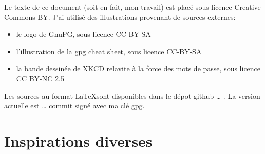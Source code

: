 \documentclass[10pt,a4paper,openany]{book}
\begin{document}
	Le texte de ce document (soit en fait, mon travail) est placé sous licence Creative Commons BY. J'ai utilisé des illustrations provenant de sources externes:
	\begin{itemize}
		\item le logo de GnuPG, sous licence CC-BY-SA
		\item l'illustration de la gpg cheat sheet, sous licence CC-BY-SA
		\item la bande dessinée de XKCD relavite à la force des mots de passe, sous licence CC BY-NC 2.5
	\end{itemize}
	
	Les sources au format \LaTeX sont disponibles dans le dépot github … . La version actuelle est … commit signé avec ma clé gpg.
	
	\tableofcontents
	
	
	
	
		
	
	
	
	
	\chapter{Inspirations diverses}
	
\end{document}
